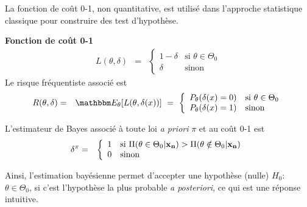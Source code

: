 La fonction de coût 0-1, non quantitative, est utilisé dans l'approche statistique classique pour construire des test d'hypothèse. \\

\begin{exo}{\bf Fonction de coût 0-1}
\begin{eqnarray}
L(\theta,\delta) & = & \left\{\begin{array}{ll} 1-\delta & \text{si $\theta\in\Theta_0$} \\ \delta & \text{sinon} \end{array}\right. \label{cout01}
\end{eqnarray}
Le risque fréquentiste associé est 
\begin{eqnarray*}
R(\theta,\delta) & = & \E_{\theta}[L(\theta,\delta(x))] \ = \ \left\{\begin{array}{ll} P_{\theta}(\delta(x)=0) & \text{si $\theta\in\Theta_0$} \\ P_{\theta}(\delta(x)=1) & \text{sinon} \end{array}\right.
\end{eqnarray*}
\end{exo}

\begin{proposition}\label{prop3}
L'estimateur de Bayes associé à toute loi {\it a priori} $\pi$ et au co\^ut 0-1 est 
\begin{eqnarray*}
\delta^{\pi} & = & \left\{\begin{array}{ll} 1 & \text{si $\Pi(\theta\in\Theta_0|{\bf x_n}) > \Pi(\theta\notin\Theta_0|{\bf x_n})$} \\ 0 & \text{sinon} \end{array}\right. \label{cout01}
\end{eqnarray*}
\end{proposition}
\if{} 
\fi
 
 
 \vspace{0.5cm}

Ainsi, l'estimation bayésienne permet d'accepter une hypothèse (nulle) $H_0:$ $\theta\in\Theta_0$, si c'est l'hypothèse la plus probable {\it a posteriori}, ce qui est une réponse intuitive. \\





